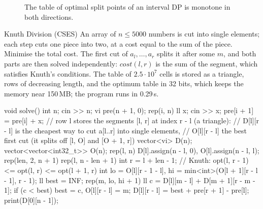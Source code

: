\begin{figure}[htbp]
\centering
{}
\caption{The table of optimal split points of an interval DP is monotone in both directions.}
\label{fig:knuth}
\end{figure}

\begin{problem}{Knuth Division (CSES)}
An array of $n \le 5000$ numbers is cut into single elements; each step cuts one piece into two, at a cost equal to the sum of the
piece. Minimise the total cost.
\solution The first cut of $a_l, \dots, a_r$ splits it after some $m$, and both parts are then solved independently:
$\mathit{cost}(l, r)$ is the sum of the segment, which satisfies Knuth's conditions. The table of $2.5 \cdot 10^7$ cells is stored as a
triangle, rows of decreasing length, and the optimum table in 32 bits, which keeps the memory near 150\,MB; the program runs in
0.29\,s.
\end{problem}

\begin{code}
void solve() {
    int n;
    cin >> n;
    vi pre(n + 1, 0);
    rep(i, n) {
        ll x;
        cin >> x;
        pre[i + 1] = pre[i] + x;
    }
    // row l stores the segments [l, r] at index r - l (a triangle):
    // D[l][r - l] is the cheapest way to cut a[l..r] into single elements,
    // O[l][r - l] the best first cut (it splits off [l, O] and [O + 1, r])
    vector<vi> D(n);
    vector<vector<int32_t>> O(n);
    rep(l, n) D[l].assign(n - l, 0), O[l].assign(n - l, l);
    rep(len, 2, n + 1) rep(l, n - len + 1) {
        int r = l + len - 1;
        // Knuth: opt(l, r - 1) <= opt(l, r) <= opt(l + 1, r)
        int lo = O[l][r - 1 - l], hi = min<int>(O[l + 1][r - l - 1], r - 1);
        ll best = INF;
        rep(m, lo, hi + 1) {
            ll c = D[l][m - l] + D[m + 1][r - m - 1];
            if (c < best) best = c, O[l][r - l] = m;
        }
        D[l][r - l] = best + pre[r + 1] - pre[l];
    }
    print(D[0][n - 1]);
}
\end{code}

